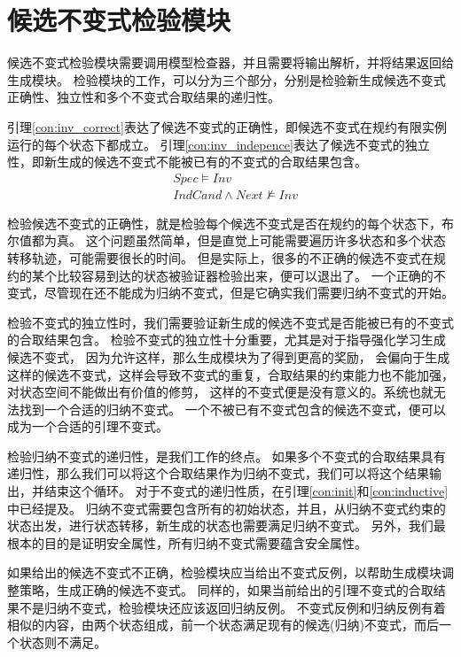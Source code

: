 \section{候选不变式检验模块}

候选不变式检验模块需要调用模型检查器，并且需要将输出解析，并将结果返回给生成模块。
检验模块的工作，可以分为三个部分，分别是检验新生成候选不变式正确性、独立性和多个不变式合取结果的递归性。

引理\ref{con:inv_correct}表达了候选不变式的正确性，即候选不变式在规约有限实例运行的每个状态下都成立。
引理\ref{con:inv_indepence}表达了候选不变式的独立性，即新生成的候选不变式不能被已有的不变式的合取结果包含。
\begin{align}
    &Spec \vDash Inv \label{con:inv_correct} \\
    &IndCand \wedge Next \nvDash Inv \label{con:inv_indepence}
\end{align}

检验候选不变式的正确性，就是检验每个候选不变式是否在规约的每个状态下，布尔值都为真。
这个问题虽然简单，但是直觉上可能需要遍历许多状态和多个状态转移轨迹，可能需要很长的时间。
但是实际上，很多的不正确的候选不变式在规约的某个比较容易到达的状态被验证器检验出来，便可以退出了。
一个正确的不变式，尽管现在还不能成为归纳不变式，但是它确实我们需要归纳不变式的开始。

检验不变式的独立性时，我们需要验证新生成的候选不变式是否能被已有的不变式的合取结果包含。
检验不变式的独立性十分重要，尤其是对于指导强化学习生成候选不变式，
因为允许这样，那么生成模块为了得到更高的奖励，
会偏向于生成这样的候选不变式，这样会导致不变式的重复，合取结果的约束能力也不能加强，对状态空间不能做出有价值的修剪，
这样的不变式便是没有意义的。系统也就无法找到一个合适的归纳不变式。
一个不被已有不变式包含的候选不变式，便可以成为一个合适的引理不变式。

检验归纳不变式的递归性，是我们工作的终点。
如果多个不变式的合取结果具有递归性，那么我们可以将这个合取结果作为归纳不变式，我们可以将这个结果输出，并结束这个循环。
对于不变式的递归性质，在引理\ref{con:init}和\ref{con:inductive}中已经提及。
归纳不变式需要包含所有的初始状态，并且，从归纳不变式约束的状态出发，进行状态转移，新生成的状态也需要满足归纳不变式。
另外，我们最根本的目的是证明安全属性，所有归纳不变式需要蕴含安全属性。

如果给出的候选不变式不正确，检验模块应当给出不变式反例，以帮助生成模块调整策略，生成正确的候选不变式。
同样的，如果当前给出的引理不变式的合取结果不是归纳不变式，检验模块还应该返回归纳反例。
不变式反例和归纳反例有着相似的内容，由两个状态组成，前一个状态满足现有的候选(归纳)不变式，而后一个状态则不满足。

